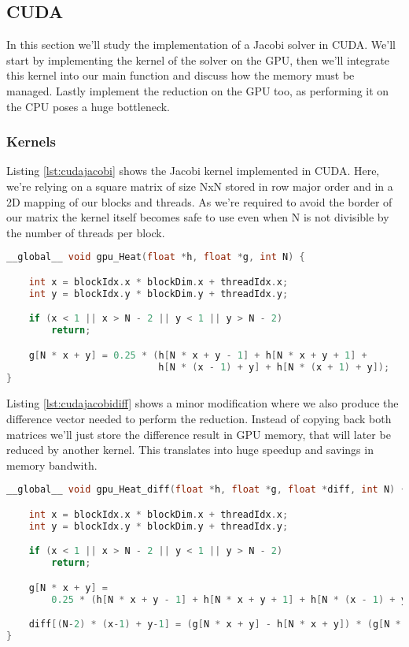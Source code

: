 \documentclass[a4paper, 10pt]{article}
\begin{document}
\clearpage

\subsection{CUDA}

In this section we'll study the implementation of a Jacobi solver in CUDA. We'll start by implementing 
the kernel of the solver on the GPU, then we'll integrate this kernel into our main function and 
discuss how the memory must be managed. Lastly implement the reduction on the GPU too, as performing it
on the CPU poses a huge bottleneck.

\subsubsection{Kernels}
Listing \ref{lst:cudajacobi} shows the Jacobi kernel implemented in CUDA. Here, we're relying on a square matrix of size NxN stored in row major order and in a 2D mapping of our blocks and threads. As we're required to avoid the border of our matrix the kernel itself becomes safe to use even when N is not divisible by the number of threads per block.
\begin{lstlisting}[language=c, caption={Jacobi kernel}, label={lst:cudajacobi}]
__global__ void gpu_Heat(float *h, float *g, int N) {

    int x = blockIdx.x * blockDim.x + threadIdx.x;
    int y = blockIdx.y * blockDim.y + threadIdx.y;

    if (x < 1 || x > N - 2 || y < 1 || y > N - 2)
        return;

    g[N * x + y] = 0.25 * (h[N * x + y - 1] + h[N * x + y + 1] + 
                           h[N * (x - 1) + y] + h[N * (x + 1) + y]);
}
\end{lstlisting}

Listing \ref{lst:cudajacobidiff} shows a minor modification where we also produce the difference vector needed to perform the reduction. Instead of copying back both matrices we'll just store the difference result in GPU memory, that will later be reduced by another kernel. This translates into huge speedup and savings in memory bandwith.
\begin{lstlisting}[language=c, caption={Jacobi with difference vector as output}, label={lst:cudajacobidiff}]
__global__ void gpu_Heat_diff(float *h, float *g, float *diff, int N) {

    int x = blockIdx.x * blockDim.x + threadIdx.x;
    int y = blockIdx.y * blockDim.y + threadIdx.y;

    if (x < 1 || x > N - 2 || y < 1 || y > N - 2)
        return;

    g[N * x + y] =
        0.25 * (h[N * x + y - 1] + h[N * x + y + 1] + h[N * (x - 1) + y] + h[N * (x + 1) + y]);

    diff[(N-2) * (x-1) + y-1] = (g[N * x + y] - h[N * x + y]) * (g[N * x + y] - h[N * x + y]);
}

\end{lstlisting}
\end{document}
